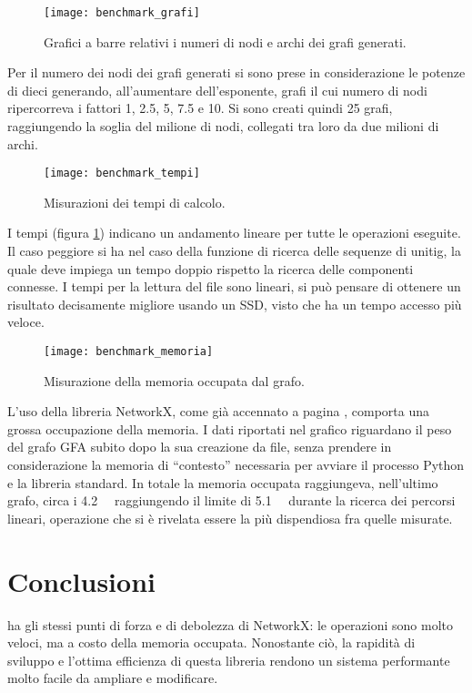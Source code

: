 \captionsetup{justification=centering, singlelinecheck=false}
\begin{figure}[h]
\centering
\texttt{[image: benchmark\_grafi]}
\caption[Grafico a barre dei grafi generati]{Grafici a barre relativi i numeri di nodi e archi dei grafi generati.}
\end{figure}
\captionsetup{justification=justified, singlelinecheck=false}
Per il numero dei nodi dei grafi generati si sono prese in considerazione
le potenze di dieci generando, all'aumentare dell'esponente, grafi il cui
numero di nodi ripercorreva i fattori 1, 2.5, 5, 7.5 e 10.
Si sono creati quindi 25 grafi, raggiungendo la soglia
del milione di nodi, collegati tra loro da due milioni di archi.


\captionsetup{justification=centering, singlelinecheck=false}
\begin{figure}
\centering
\texttt{[image: benchmark\_tempi]}
\caption[Grafici dei tempi di calcolo delle operazioni su grafo]{Misurazioni dei tempi di calcolo.}
\label{fig:bench-timings}
\end{figure}
\captionsetup{justification=justified, singlelinecheck=false}
I tempi (figura \ref{fig:bench-timings}) indicano un andamento lineare
per tutte le operazioni eseguite. Il caso peggiore si ha nel caso
della funzione di ricerca delle sequenze di unitig, la quale deve
impiega un tempo doppio rispetto la ricerca delle componenti connesse.
I tempi per la lettura del file sono lineari, si può pensare di ottenere
un risultato decisamente migliore usando un SSD, visto che
ha un tempo accesso più veloce.

\clearpage
\captionsetup{justification=centering, singlelinecheck=false}
\begin{figure}[h]
\centering
\texttt{[image: benchmark\_memoria]}
\caption[Grafici della memoria occupata dal grafo]{Misurazione della memoria occupata dal grafo.}
\end{figure}
\captionsetup{justification=justified, singlelinecheck=false}
L'uso della libreria NetworkX, come già accennato a pagina \pageref{sec:nx-why-limits},
comporta una grossa occupazione della memoria. I dati riportati nel grafico
riguardano il peso del grafo GFA subito dopo la sua creazione da file, senza
prendere in considerazione la memoria di ``contesto'' necessaria per avviare
il processo Python e la libreria standard. In totale la memoria occupata
raggiungeva, nell'ultimo grafo, circa i \SI{4.2}{\giga\byte} raggiungendo
il limite di \SI{5.1}{\giga\byte} durante la ricerca dei percorsi lineari, operazione
che si è rivelata essere la più dispendiosa fra quelle misurate.

\section{Conclusioni}
\pygfa ha gli stessi punti di forza e di debolezza di NetworkX:
le operazioni sono molto veloci, ma a costo della memoria occupata.
Nonostante ciò, la rapidità di sviluppo e l'ottima efficienza di questa libreria
rendono \pygfa un sistema performante molto facile da ampliare e modificare.
